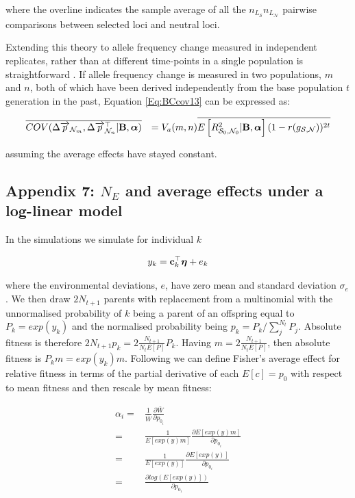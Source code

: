 \documentclass[12pt]{article}
\begin{document}
\begin{bibunit}
where the overline indicates the sample average of all the $n_{L_\mathcal{S}}n_{L_\mathcal{N}}$ pairwise comparisons between selected loci and neutral loci. 

Extending this theory to allele frequency change measured in independent replicates, rather than at different time-points in a single population is straightforward \citep{Buffalo.2020}. If allele frequency change is measured in two populations, $m$ and $n$,  both of which have been derived independently from the base population $t$ generation  in the past, Equation  \ref{Eq:BCcov13} can be expressed as:

\begin{equation}
\begin{array}{rl}
\overline{COV(\Delta \overrightarrow{p}_{{\mathcal N}_m}, \Delta \overrightarrow{p}_{{\mathcal N}_n}^\top | {\bf B}, \boldsymbol{\alpha})}&=
V_a(m,n)\overline{E\left[R_{{\mathcal S}_0,{\mathcal N}_0}^2 | {\bf B}, \boldsymbol{\alpha}\right](1-r(g_{{\mathcal S},{\mathcal N}}))^{2t}}\\
\end{array}
\label{Eq:BCcov14}
\end{equation}

assuming the average effects have stayed constant.


\subsection[Appendix 7]{Appendix 7: $N_E$ and average effects under a log-linear model}
\label{App:loglinear}

In the simulations we simulate for individual $k$

$$y_k={\bf c}^{\top}_k\boldsymbol{\eta}+e_k$$

where the environmental deviations, $e$, have zero mean and standard deviation $\sigma_e$.  We then draw $2N_{t+1}$ parents with replacement from a multinomial with the unnormalised  probability of $k$ being a parent of an offspring equal to  $P_k=exp(y_k)$ and the normalised probability being $p_k=P_k/\sum_{j}^{N_t}P_j$. Absolute fitness is therefore $2N_{t+1}p_k = 2\frac{N_{t+1}}{N_tE[P]}P_k$. Having $m = 2\frac{N_{t+1}}{N_tE[P]}$, then absolute fitness is $P_km=exp(y_k)m$.  Following \citet{Kojima.1959} we can define Fisher's average effect for relative fitness in terms of the partial derivative of each $E[c]=p_0$ with respect to mean fitness and then rescale by mean fitness:

\begin{equation}
\begin{array}{rl}
\alpha_i =& \frac{1}{\bar W}\frac{\partial{\bar W}}{\partial{p_{0_i}}}\\
 =& \frac{1}{E[exp(y)m]}\frac{\partial{E[exp(y)m]}}{\partial{p_{0_i}}}\\
 =&  \frac{1}{E[exp(y)]}\frac{\partial{E[exp(y)]}}{\partial{p_{0_i}}}\\
  =&  \frac{\partial{log(E[exp(y)])}}{\partial{p_{0_i}}}\\
\end{array}
\end{equation}


\end{bibunit}
\end{document}
